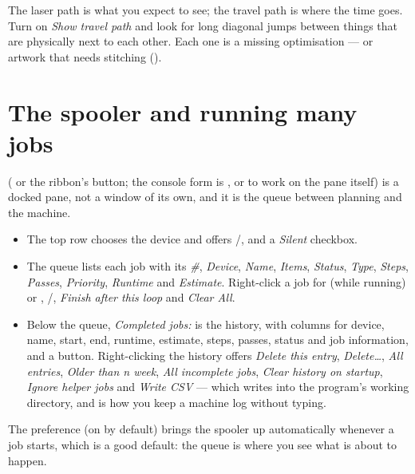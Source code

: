 \begin{tipbox}
The laser path is what you expect to see; the travel path is where the time goes.
Turn on \emph{Show travel path} and look for long diagonal jumps between things
that are physically next to each other. Each one is a missing optimisation --- or
artwork that needs stitching ().
\end{tipbox}

\section{The spooler and running many jobs}

 ( or the ribbon's  button; the
console form is , or  to
work on the pane itself) is a docked pane, not a window of its own, and it is the
queue between planning and the machine.

\begin{itemize}
  \item The top row chooses the device and offers /,
         and a \emph{Silent} checkbox.
  \item The queue lists each job with its \emph{\#}, \emph{Device}, \emph{Name},
        \emph{Items}, \emph{Status}, \emph{Type}, \emph{Steps}, \emph{Passes},
        \emph{Priority}, \emph{Runtime} and \emph{Estimate}. Right-click a job for
         (while running) or , /,
        \emph{Finish after this loop} and \emph{Clear All}.
  \item Below the queue, \emph{Completed jobs:} is the history, with columns for
        device, name, start, end, runtime, estimate, steps, passes, status and job
        information, and a  button. Right-clicking the history
        offers \emph{Delete this entry}, \emph{Delete\dots}, \emph{All entries},
        \emph{Older than \emph{n} week}, \emph{All incomplete jobs},
        \emph{Clear history on startup}, \emph{Ignore helper jobs} and
        \emph{Write CSV} --- which writes  into the program's
        working directory, and is how you keep a machine log without typing.
\end{itemize}

\noindent The  preference (on by default) brings
the spooler up automatically whenever a job starts, which is a good default: the
queue is where you see what is about to happen.

